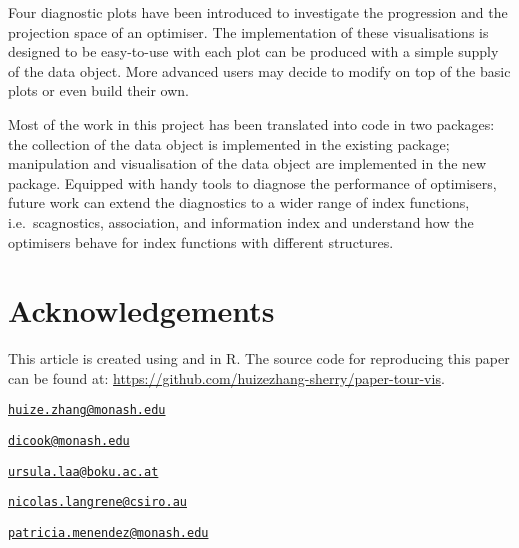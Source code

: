 Four diagnostic plots have been introduced to investigate the
progression and the projection space of an optimiser. The implementation
of these visualisations is designed to be easy-to-use with each plot can
be produced with a simple supply of the data object. More advanced users
may decide to modify on top of the basic plots or even build their own.

Most of the work in this project has been translated into code in two
packages: the collection of the data object is implemented in the
existing \citep{tourr} package; manipulation and
visualisation of the data object are implemented in the new 
package. Equipped with handy tools to diagnose the performance of
optimisers, future work can extend the diagnostics to a wider range of
index functions, i.e.~scagnostics, association, and information index
\citep{laa2020using} and understand how the optimisers behave for index
functions with different structures.

\hypertarget{acknowledgements}{%
\section{Acknowledgements}\label{acknowledgements}}

This article is created using \citep{knitr} and
 \citep{rmarkdown} in R. The source code for
reproducing this paper can be found at:
\url{https://github.com/huizezhang-sherry/paper-tour-vis}.




\address{%
H.Sherry Zhang\\
Monash University\\
Department of Econometrics and Business Statistics\\
}
\href{mailto:huize.zhang@monash.edu}{\nolinkurl{huize.zhang@monash.edu}}

\address{%
Dianne Cook\\
Monash University\\
Department of Econometrics and Business Statistics\\
}
\href{mailto:dicook@monash.edu}{\nolinkurl{dicook@monash.edu}}

\address{%
Ursula Laa\\
University of Natural Resources and Life Sciences\\
Institute of Statistics\\
}
\href{mailto:ursula.laa@boku.ac.at}{\nolinkurl{ursula.laa@boku.ac.at}}

\address{%
Nicolas Langrené\\
CSIRO Data61\\
34 Village Street, Docklands VIC 3008 Australia\\
}
\href{mailto:nicolas.langrene@csiro.au}{\nolinkurl{nicolas.langrene@csiro.au}}

\address{%
Patricia Menéndez\\
Monash University\\
Department of Econometrics and Business Statistics\\
}
\href{mailto:patricia.menendez@monash.edu}{\nolinkurl{patricia.menendez@monash.edu}}

